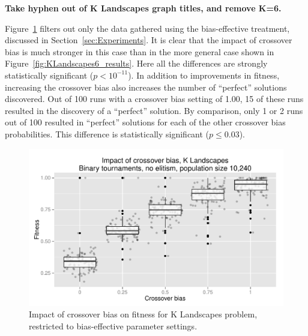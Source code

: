 \documentclass{sig-alternate}
\begin{document}
\textbf{Take hyphen out of K Landscapes graph titles, and remove K=6.}

Figure~\ref{fig:KLandscapes6_strong_results} filters out only the data gathered using the bias-effective treatment,
discussed in Section~\ref{sec:Experiments}. It is clear that the impact of crossover bias is much stronger in this case
than in the more general case shown in Figure~\ref{fig:KLandscapes6_results}. Here all the differences are strongly
statistically significant ($p < 10^{-11}$). In addition to improvements in fitness, increasing the crossover bias also
increases the number of ``perfect'' solutions discovered. Out of 100 runs with a crossover bias setting of 1.00, 15 of
these runs resulted in the discovery of a ``perfect'' solution. By comparison, only 1 or 2 runs out of 100 resulted in
``perfect'' solutions for each of the other crossover bias probabilities. This difference is statistically significant
($p \leq 0.03$).

\begin{figure}
\centering
\includegraphics[width=0.45 \textwidth]{Plots/KLandscapes6_XO_bias_strong_impact_alpha_075.pdf}
\caption{Impact of crossover bias on fitness for K Landscapes problem, restricted to bias-effective parameter settings.}
\label{fig:KLandscapes6_strong_results}
\end{figure}

%
%
%
%

%
%
%
%
\end{document}
